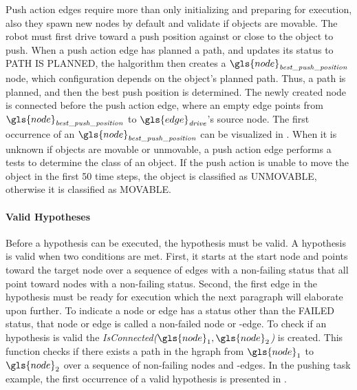 Push action edges require more than only initializing and preparing for execution, also they spawn new nodes by default and validate if objects are movable. The robot must first drive toward a push position against or close to the object to push. When a push action edge has planned a path, and updates its status to PATH IS PLANNED, the \ac{halgorithm} then creates a $\gls{node}_\mathit{best\_push\_position}$ node, which configuration depends on the object's planned path. Thus, a path is planned, and then the best push position is determined. The newly created node is connected before the push action edge, where an empty edge points from $\gls{node}_\mathit{best\_push\_position}$ to $\gls{edge}_\mathit{drive}$'s source node. The first occurrence of an $\gls{node}_\mathit{best\_push\_position}$ can be visualized in . When it is unknown if objects are movable or unmovable, a push action edge performs a tests to determine the class of an object. If the push action is unable to move the object in the first 50 time steps, the object is classified as UNMOVABLE, otherwise it is classified as MOVABLE.\bs

\paragraph{Valid Hypotheses}
Before a hypothesis can be executed, the hypothesis must be valid. A hypothesis is valid when two conditions are met. First, it starts at the start node and points toward the target node over a sequence of edges with a non-failing status that all point toward nodes with a non-failing status. Second, the first edge in the hypothesis must be ready for execution which the next paragraph will elaborate upon further. To indicate a node or edge has a status other than the FAILED status, that node or edge is called a non-failed node or -edge. To check if an hypothesis is valid the \textit{IsConnected($\gls{node}_1, \gls{node}_2$)} is created. This function checks if there exists a path in the \ac{hgraph} from $\gls{node}_1$ to $\gls{node}_2$ over a sequence of non-failing nodes and -edges. In the pushing task example, the first occurrence of a valid hypothesis is presented in .\bs

